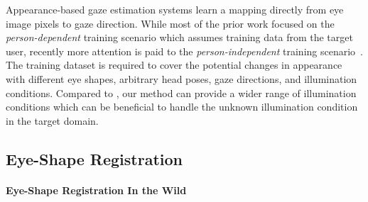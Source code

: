 Appearance-based gaze estimation systems learn a mapping directly from eye image pixels to gaze direction.
While most of the prior work focused on the {\em person-dependent} training scenario which assumes training data from the target user, recently more attention is paid to the {\em person-independent} training scenario~\cite{funes2013person,schneider2014manifold,sugano2014learning,zhang15_cvpr}. 
The training dataset is required to cover the potential changes in appearance with different eye shapes, arbitrary head poses, gaze directions, and illumination conditions.
%
Compared to \citet{sugano2014learning}, our method can provide a wider range of illumination conditions which can be beneficial to handle the unknown illumination condition in the target domain.



\subsection{Eye-Shape Registration}


\paragraph{Eye-Shape Registration In the Wild}


